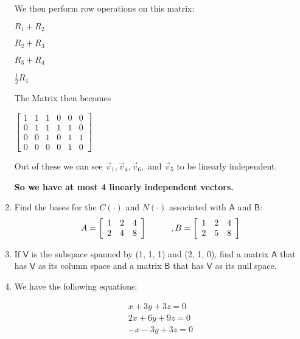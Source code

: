\documentclass[a4paper, 11pt]{article}
\newcommand{\mat}[1]{\boldsymbol { \mathsf{#1}} }
\begin{document}
\begin{enumerate}
\begin{center}
\end{center}

We then perform row operations on this matrix:
\begin{center}
$R_1 + R_2$

$R_2 + R_3$

$R_3 + R_4$

$\frac{1}{2} R_4$
\end{center}

The Matrix then becomes 

\begin{center}
$
\begin{bmatrix}
1 & 1 & 1 & 0 & 0 & 0 \\
0 & 1 & 1 & 1 & 1 & 0\\
0 & 0 & 1 & 0 & 1 & 1\\ 
0 & 0 & 0 & 0 & 1 & 0 
\end{bmatrix}
$
\end{center}

Out of these we can see $\vec v_1, \vec v_4, \vec v_6,$ and $\vec v_5$ to be linearly independent.

\textbf{So we have at most 4 linearly independent vectors.}


\item Find the bases for the $C(\mat \cdot)$ and $N(\mat \cdot)$ associated with $\mat A$ and $\mat B$:
\[ A = \left[ \begin{array}{ccc}
1&2&4\\
2&4&8
\end{array} \right]
\hspace{10mm}, B = \left[ \begin{array}{ccc}
1&2&4\\
2&5&8
\end{array} \right]\]

\item If $\mat V$ is the subspace spanned by (1, 1, 1) and (2, 1, 0), find a matrix $\mat A$ that has $\mat V$ as its column space and a matrix $\mat B$ that has $\mat V$ as its null space.


\item We have the following equations:

\begin{equation} \label{eq1}
\begin{split}
x + 3y + 3z  = 0\\
2x + 6y + 9z = 0\\
-x - 3y +3z  = 0
\end{split}
\end{equation}


\end{enumerate}
\end{document}
